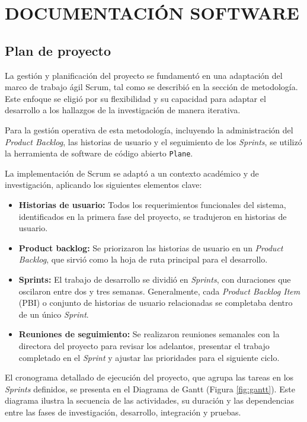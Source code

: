 \chapter{DOCUMENTACIÓN SOFTWARE}


\section{Plan de proyecto}
La gestión y planificación del proyecto se fundamentó en una adaptación del marco de trabajo ágil Scrum, tal como se describió en la sección de metodología. Este enfoque se eligió por su flexibilidad y su capacidad para adaptar el desarrollo a los hallazgos de la investigación de manera iterativa.

Para la gestión operativa de esta metodología, incluyendo la administración del \textit{Product Backlog}, las historias de usuario y el seguimiento de los \textit{Sprints}, se utilizó la herramienta de software de código abierto \texttt{Plane}.

La implementación de Scrum se adaptó a un contexto académico y de investigación, aplicando los siguientes elementos clave:
\begin{itemize}
    \item \textbf{Historias de usuario:} Todos los requerimientos funcionales del sistema, identificados en la primera fase del proyecto, se tradujeron en historias de usuario.
    \item \textbf{Product backlog:} Se priorizaron las historias de usuario en un \textit{Product Backlog}, que sirvió como la hoja de ruta principal para el desarrollo.
    \item \textbf{Sprints:} El trabajo de desarrollo se dividió en \textit{Sprints}, con duraciones que oscilaron entre dos y tres semanas. Generalmente, cada \textit{Product Backlog Item} (PBI) o conjunto de historias de usuario relacionadas se completaba dentro de un único \textit{Sprint}.
    \item \textbf{Reuniones de seguimiento:} Se realizaron reuniones semanales con la directora del proyecto para revisar los adelantos, presentar el trabajo completado en el \textit{Sprint} y ajustar las prioridades para el siguiente ciclo.
\end{itemize}

El cronograma detallado de ejecución del proyecto, que agrupa las tareas en los \textit{Sprints} definidos, se presenta en el Diagrama de Gantt (Figura \ref{fig:gantt}). Este diagrama ilustra la secuencia de las actividades, su duración y las dependencias entre las fases de investigación, desarrollo, integración y pruebas.


